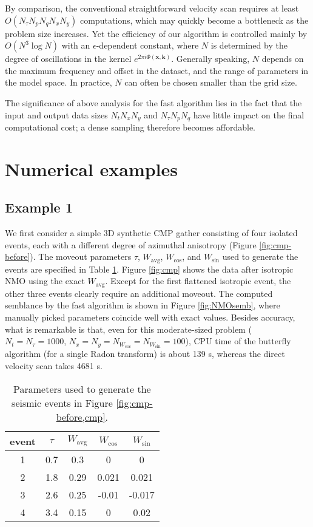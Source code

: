 By comparison, the conventional straightforward velocity scan requires at least $O(N_{\tau}N_pN_qN_xN_y)$ computations, which may quickly become a bottleneck as the problem size increases. Yet the efficiency of our algorithm is controlled mainly  by $O(N^3\log N)$ with an $\epsilon$-dependent constant, where $N$ is determined by the degree of oscillations in the kernel $e^{2\pi i \Phi(\mathbf{x},\mathbf{k})}$. Generally speaking, $N$ depends on the maximum frequency and offset in the dataset, and the range of parameters in the model space. In practice, $N$ can often be chosen smaller than the grid size. 

The significance of above analysis for the fast algorithm lies in the fact that the input and output data sizes $N_tN_xN_y$ and $N_{\tau}N_p N_q$ have little impact on the final computational cost; a dense sampling therefore becomes affordable. %


\section{Numerical examples}


\subsection{Example 1}

We first consider a simple 3D synthetic CMP gather consisting of four isolated events, each with a different degree of azimuthal anisotropy (Figure \ref{fig:cmp-before}). The moveout parameters $\tau$, $W_{\text{avg}}$, $W_{\cos}$, and $W_{\sin}$ used to generate the events are specified in Table \ref{table2}. Figure \ref{fig:cmp} shows the data after isotropic NMO using the exact $W_{\text{avg}}$. Except for the first flattened isotropic event, the other three events clearly require an additional moveout. The computed semblance by the fast algorithm is shown in Figure \ref{fig:NMOsemb}, where manually picked parameters coincide well with exact values. Besides accuracy, what is remarkable is that, even for this moderate-sized problem ($N_t=N_{\tau}=1000$, $N_x=N_y=N_{W_{\cos}}=N_{W_{\sin}}=100$), CPU time of the butterfly algorithm (for a single Radon transform) is about 139 s, whereas the direct velocity scan takes 4681 s.

\begin{table}
\centering
\begin{tabular}{ c c c c c}
\hline
event &   $\tau$ & $W_{\text{avg}}$ & $W_{\cos}$ & $W_{\sin}$  \\ \hline
1&  0.7 & 0.3 & 0 & 0\\ \hline
2&  1.8 & 0.29 & 0.021 & 0.021\\ \hline
3&  2.6 & 0.25 & -0.01 & -0.017\\ \hline
4&  3.4 & 0.15 & 0 & 0.02\\ \hline
\end{tabular}
\caption{Parameters used to generate the seismic events in Figure \ref{fig:cmp-before,cmp}.}
\label{table2}
\end{table}

